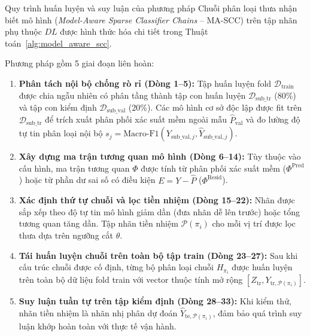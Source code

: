\documentclass[11pt,a4paper]{article}
\begin{document}
Quy trình huấn luyện và suy luận của phương pháp Chuỗi phân loại thưa nhận biết mô hình (\textit{Model-Aware Sparse Classifier Chains} -- MA-SCC) trên tập nhãn phụ thuộc $DL$ được hình thức hóa chi tiết trong Thuật toán~\ref{alg:model_aware_scc}.

Phương pháp gồm 5 giai đoạn liên hoàn:
\begin{enumerate}[leftmargin=*]
  \item \textbf{Phân tách nội bộ chống rò rỉ (Dòng 1--5):} Tập huấn luyện fold $\mathcal{D}_{\text{train}}$ được chia ngẫu nhiên có phân tầng thành tập con huấn luyện $\mathcal{D}_{\text{sub\_tr}}$ (80\%) và tập con kiểm định $\mathcal{D}_{\text{sub\_val}}$ (20\%). Các mô hình cơ sở độc lập được fit trên $\mathcal{D}_{\text{sub\_tr}}$ để trích xuất phân phối xác suất mềm ngoài mẫu $\hat{P}_{\text{val}}$ và đo lường độ tự tin phân loại nội bộ $s_j = \text{Macro-F1}(Y_{\text{sub\_val}, j}, \hat{Y}_{\text{sub\_val}, j})$.
  \item \textbf{Xây dựng ma trận tương quan mô hình (Dòng 6--14):} Tùy thuộc vào cấu hình, ma trận tương quan $\Phi$ được tính từ phân phối xác suất mềm ($\Phi^{\text{Pred}}$) hoặc từ phần dư sai số có điều kiện $E = Y - \hat{P}$ ($\Phi^{\text{Resid}}$).
  \item \textbf{Xác định thứ tự chuỗi và lọc tiền nhiệm (Dòng 15--22):} Nhãn được sắp xếp theo độ tự tin mô hình giảm dần (đưa nhãn dễ lên trước) hoặc tổng tương quan tăng dần. Tập nhãn tiền nhiệm $\mathcal{P}(\pi_i)$ cho mỗi vị trí được lọc thưa dựa trên ngưỡng cắt $\theta$.
  \item \textbf{Tái huấn luyện chuỗi trên toàn bộ tập train (Dòng 23--27):} Sau khi cấu trúc chuỗi được cố định, từng bộ phân loại chuỗi $H_{\pi_i}$ được huấn luyện trên toàn bộ dữ liệu fold train với vector thuộc tính mở rộng $[Z_{\text{tr}}, Y_{\text{tr}, \mathcal{P}(\pi_i)}]$.
  \item \textbf{Suy luận tuần tự trên tập kiểm định (Dòng 28--33):} Khi kiểm thử, nhãn tiền nhiệm là nhãn nhị phân dự đoán $\hat{Y}_{\text{te}, \mathcal{P}(\pi_i)}$, đảm bảo quá trình suy luận khớp hoàn toàn với thực tế vận hành.
\end{enumerate}
\end{document}
